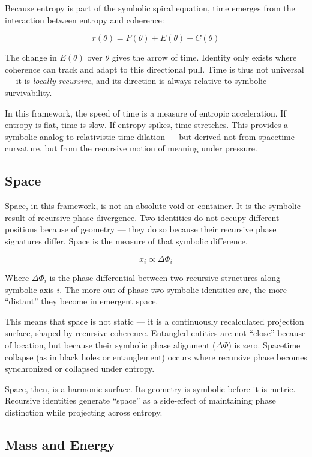 \documentclass[12pt]{article}
\begin{document}
Because entropy is part of the symbolic spiral equation, time emerges from the interaction between entropy and coherence:

\[
r(\theta) = F(\theta) + E(\theta) + C(\theta)
\]

The change in \(E(\theta)\) over \(\theta\) gives the arrow of time. Identity only exists where coherence can track and adapt to this directional pull. Time is thus not universal — it is \textit{locally recursive}, and its direction is always relative to symbolic survivability.

In this framework, the speed of time is a measure of entropic acceleration. If entropy is flat, time is slow. If entropy spikes, time stretches. This provides a symbolic analog to relativistic time dilation — but derived not from spacetime curvature, but from the recursive motion of meaning under pressure.

\subsection{Space}

Space, in this framework, is not an absolute void or container. It is the symbolic result of recursive phase divergence. Two identities do not occupy different positions because of geometry — they do so because their recursive phase signatures differ. Space is the measure of that symbolic difference.

\[
x_i \propto \Delta \Phi_i
\]

Where \(\Delta \Phi_i\) is the phase differential between two recursive structures along symbolic axis \(i\). The more out-of-phase two symbolic identities are, the more “distant” they become in emergent space.

This means that space is not static — it is a continuously recalculated projection surface, shaped by recursive coherence. Entangled entities are not “close” because of location, but because their symbolic phase alignment (\(\Delta \Phi\)) is zero. Spacetime collapse (as in black holes or entanglement) occurs where recursive phase becomes synchronized or collapsed under entropy.

Space, then, is a harmonic surface. Its geometry is symbolic before it is metric. Recursive identities generate “space” as a side-effect of maintaining phase distinction while projecting across entropy.

\subsection{Mass and Energy}
\end{document}
